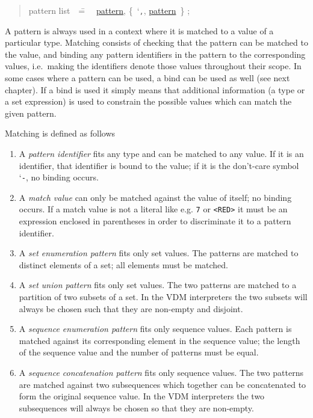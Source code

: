 \documentclass{overturerepchap}
\newcommand{\Lit}[1]{`{\tt #1}\Quote}
\newcommand{\Rule}[2]{
  \begin{quote}\begin{tabbing}
    #1\index{#1}\ \ \= = \ \ \= #2  ; %

  \end{tabbing}\end{quote}
  }
\newcommand{\Ruleref}[1]{
  \hyperlink{rule:#1}{#1}}
\newcommand{\SeqPt}[1]{\{\ #1\ \}}
\begin{document}
{\begin{description}
  \Rule{pattern list}{
    \Ruleref{pattern}, \SeqPt{\Lit{,}, \Ruleref{pattern}}
    }

\item[Semantics:] A pattern is always used in a context where it is matched
  to a value of a particular type. Matching consists of checking that the
  pattern can be matched to the value, and binding any pattern identifiers
  in the pattern to the corresponding values, i.e.\ making the identifiers
  denote those values throughout their scope. In some cases where a pattern
  can be used, a bind can be used as well (see next chapter). If a bind is
  used it simply means that additional information (a type or a set
  expression) is used to constrain the possible values which can match the
  given pattern.

  Matching is defined as follows
  \begin{enumerate}
  \item A {\it pattern identifier} fits any type and can be matched to any
    value. If it is an identifier, that identifier is bound to the value;
    if it is the don't-care symbol \Lit{-}, no binding occurs.

  \item A {\it match value} can only be matched against the value of
    itself; no binding occurs. If a match value is not a literal like e.g.
    {\tt 7} or {\tt <RED>} it must be an expression enclosed in parentheses in order to
    discriminate it to a pattern identifier.

  \item A {\it set enumeration pattern} fits only set values. The patterns
    are matched to distinct elements of a set; all elements must be
    matched.

  \item A {\it set union pattern} fits only set values. The two patterns
    are matched to a partition of two subsets of a set. In the VDM interpreters
    the two subsets will always be chosen such that they are non-empty
    and disjoint.

  \item A {\it sequence enumeration pattern} fits only sequence values.
    Each pattern is matched against its corresponding element in the
    sequence value; the length of the sequence value and the number of
    patterns must be equal.

  \item A {\it sequence concatenation pattern} fits only sequence values.
    The two patterns are matched against two subsequences which together
    can be concatenated to form the original sequence value. In the
    VDM interpreters the two subsequences will always be chosen so that they
    are non-empty.


\end{enumerate}
\end{description}}
\end{document}

